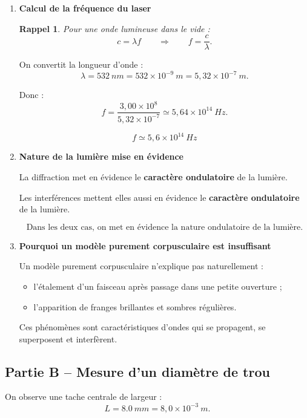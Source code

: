 \documentclass[11pt,a4paper]{article}
\newtheorem*{rappel}{Rappel}
\begin{document}
\begin{enumerate}[label=\textbf{1.\arabic*}, leftmargin=1.6em]

\item \textbf{Calcul de la fréquence du laser}

\begin{rappel}
Pour une onde lumineuse dans le vide :
\[
c=\lambda f
\qquad\Longrightarrow\qquad
f=\frac{c}{\lambda}.
\]
\end{rappel}

On convertit la longueur d’onde :
\[
\lambda=\SI{532}{nm}=532\times 10^{-9}\ \si{m}=5{,}32\times 10^{-7}\ \si{m}.
\]

Donc :
\[
f=\frac{3{,}00\times 10^8}{5{,}32\times 10^{-7}}
\simeq 5{,}64\times 10^{14}\ \si{Hz}.
\]

\[
\boxed{f \simeq 5{,}6\times 10^{14}\ \si{Hz}}
\]

\item \textbf{Nature de la lumière mise en évidence}

La diffraction met en évidence le \textbf{caractère ondulatoire} de la lumière.

Les interférences mettent elles aussi en évidence le \textbf{caractère ondulatoire} de la lumière.

\[
\boxed{\text{Dans les deux cas, on met en évidence la nature ondulatoire de la lumière.}}
\]

\item \textbf{Pourquoi un modèle purement corpusculaire est insuffisant}

Un modèle purement corpusculaire n’explique pas naturellement :
\begin{itemize}
    \item l’étalement d’un faisceau après passage dans une petite ouverture ;
    \item l’apparition de franges brillantes et sombres régulières.
\end{itemize}

Ces phénomènes sont caractéristiques d’ondes qui se propagent, se superposent et interfèrent.

\end{enumerate}

\subsection*{Partie B -- Mesure d’un diamètre de trou}

On observe une tache centrale de largeur :
\[
L=\SI{8,0}{mm}=8{,}0\times 10^{-3}\ \si{m}.
\]
\end{document}
